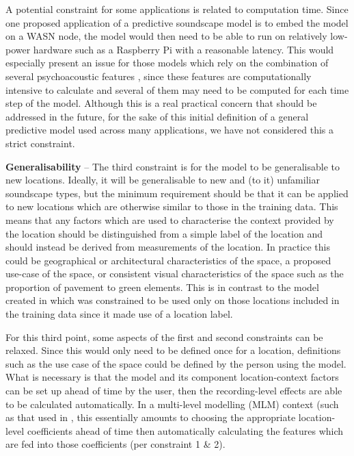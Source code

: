 \documentclass[
  authoryear,
  preprint,
  1p]{elsarticle}
\begin{document}
A potential constraint for some applications is related to computation
time. Since one proposed application of a predictive soundscape model is
to embed the model on a WASN node, the model would then need to be able
to run on relatively low-power hardware such as a Raspberry Pi with a
reasonable latency. This would especially present an issue for those
models which rely on the combination of several psychoacoustic features
\citep[such as][]{Mitchell2021Investigating, Orga2021Multilevel}, since
these features are computationally intensive to calculate and several of
them may need to be computed for each time step of the model. Although
this is a real practical concern that should be addressed in the future,
for the sake of this initial definition of a general predictive model
used across many applications, we have not considered this a strict
constraint.

\textbf{Generalisability} -- The third constraint is for the model to be
generalisable to new locations. Ideally, it will be generalisable to new
and (to it) unfamiliar soundscape types, but the minimum requirement
should be that it can be applied to new locations which are otherwise
similar to those in the training data. This means that any factors which
are used to characterise the context provided by the location should be
distinguished from a simple label of the location and should instead be
derived from measurements of the location. In practice this could be
geographical or architectural characteristics of the space, a proposed
use-case of the space, or consistent visual characteristics of the space
such as the proportion of pavement to green elements. This is in
contrast to the model created in \citet{Mitchell2021Investigating} which
was constrained to be used only on those locations included in the
training data since it made use of a location label.

For this third point, some aspects of the first and second constraints
can be relaxed. Since this would only need to be defined once for a
location, definitions such as the use case of the space could be defined
by the person using the model. What is necessary is that the model and
its component location-context factors can be set up ahead of time by
the user, then the recording-level effects are able to be calculated
automatically. In a multi-level modelling (MLM) context (such as that
used in \citep{Mitchell2021Investigating}, this essentially amounts to
choosing the appropriate location-level coefficients ahead of time then
automatically calculating the features which are fed into those
coefficients (per constraint 1 \& 2).
\end{document}
